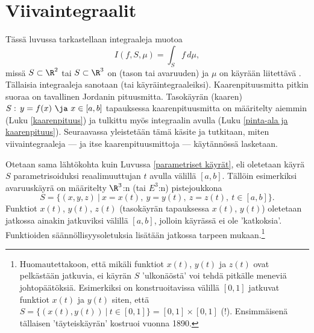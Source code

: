 \section{Viivaintegraalit} \label{viivaintegraalit}
\alku
{}

Tässä luvussa tarkastellaan integraaleja muotoa
\[
I(f,S,\mu)=\int_S f\,d\mu,
\]
missä $S\subset\R^2$ tai $S\subset\R^3$ on (tason tai avaruuden)  ja $\mu$ on käyrään
liitettävä . Tällaisia integraaleja sanotaan 
(tai käyräintegraaleiksi). Kaarenpituusmitta pitkin suoraa on tavallinen Jordanin pituusmitta. 
Tasokäyrän (kaaren) $S:\,y=f(x)\ \ja\ x\in[a,b]$ tapauksessa kaarenpituusmitta
on määritelty aiemmin (Luku \ref{kaarenpituus}) ja tulkittu myös integraalin avulla
(Luku \ref{pinta-ala ja kaarenpituus}). Seuraavassa yleistetään tämä käsite ja tutkitaan, miten 
viivaintegraaleja --- ja itse kaarenpituusmittoja --- käytännössä lasketaan.

Otetaan sama lähtökohta kuin Luvussa \ref{parametriset käyrät}, eli oletetaan käyrä $S$ 
parametrisoiduksi reaalimuuttujan $t$ avulla välillä $[a,b]$. Tällöin esimerkiksi avaruuskäyrä
on määritelty $\R^3$:n (tai $E^3$:n) pistejoukkona
\[
S=\{(x,y,z) \ | \ x=x(t), \ y=y(t), \ z=z(t), \ t\in [a,b]\}.
\]
Funktiot $x(t)$, $y(t)$, $z(t)$ (tasokäyrän tapauksessa $x(t)$, $y(t)$) oletetaan jatkossa 
ainakin jatkuviksi välillä $[a,b]$, jolloin käyrässä ei ole 'katkoksia'. Funktioiden
säännöllisyysoletuksia lisätään jatkossa tarpeen mukaan.\footnote[2]{Huomautettakoon, että 
mikäli funktiot $x(t)$, $y(t)$ ja $z(t)$ ovat pelkästään jatkuvia, ei käyrän $S$ 'ulkonäöstä'
voi tehdä pitkälle meneviä johtopäätöksiä. Esimerkiksi on konstruoitavissa välillä $[0,1]$ 
jatkuvat funktiot $x(t)$ ja $y(t)$ siten, että
$S=\{(x(t),y(t)) \ | \ t\in [0,1]\}=[0,1]\times [0,1]$ (!).
Ensimmäisenä tällaisen 'täyteiskäyrän' kostruoi  vuonna 1890. 
} 

